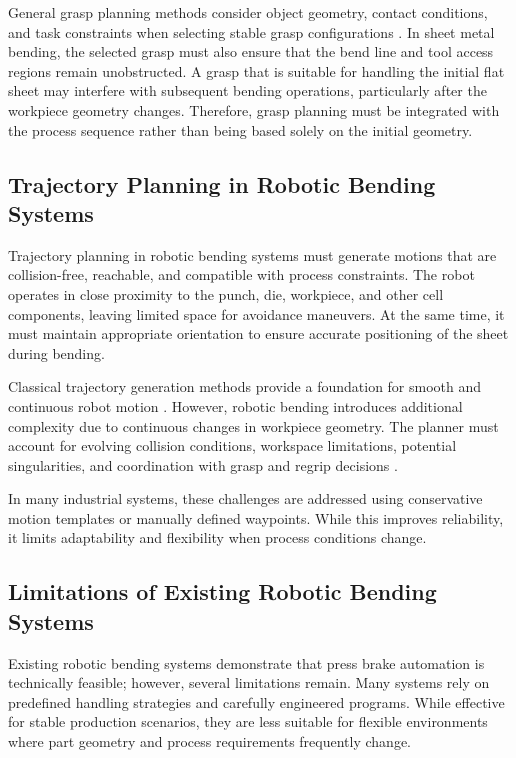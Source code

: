 General grasp planning methods consider object geometry, contact conditions, and task constraints when selecting stable grasp configurations \cite{bohg2014data}. In sheet metal bending, the selected grasp must also ensure that the bend line and tool access regions remain unobstructed. A grasp that is suitable for handling the initial flat sheet may interfere with subsequent bending operations, particularly after the workpiece geometry changes. Therefore, grasp planning must be integrated with the process sequence rather than being based solely on the initial geometry.

\subsection{Trajectory Planning in Robotic Bending Systems}
\label{subsec:trajectory-planning-robotic-bending-systems}

Trajectory planning in robotic bending systems must generate motions that are collision-free, reachable, and compatible with process constraints. The robot operates in close proximity to the punch, die, workpiece, and other cell components, leaving limited space for avoidance maneuvers. At the same time, it must maintain appropriate orientation to ensure accurate positioning of the sheet during bending.

Classical trajectory generation methods provide a foundation for smooth and continuous robot motion \cite{Gasparetto2012Trajectory}. However, robotic bending introduces additional complexity due to continuous changes in workpiece geometry. The planner must account for evolving collision conditions, workspace limitations, potential singularities, and coordination with grasp and regrip decisions \cite{Gupta1998SheetMetalBending}.

In many industrial systems, these challenges are addressed using conservative motion templates or manually defined waypoints. While this improves reliability, it limits adaptability and flexibility when process conditions change.

\subsection{Limitations of Existing Robotic Bending Systems}
\label{subsec:limitations-existing-robotic-bending-systems}

Existing robotic bending systems demonstrate that press brake automation is technically feasible; however, several limitations remain. Many systems rely on predefined handling strategies and carefully engineered programs. While effective for stable production scenarios, they are less suitable for flexible environments where part geometry and process requirements frequently change.

